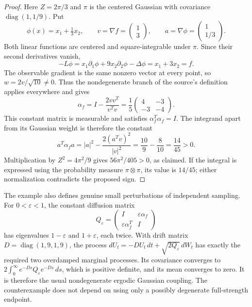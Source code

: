 \documentclass[10pt]{article}
\begin{document}
\begin{proof}
Here \(Z=2\pi/3\) and \(\pi\) is the centered Gaussian with covariance
\(\operatorname{diag}(1,1/9)\). Put
\[
 \phi(x)=x_1+\tfrac13x_2,\qquad
 v=\nabla f=\begin{pmatrix}1\\3\end{pmatrix},\qquad
 a=\nabla\phi=\begin{pmatrix}1\\1/3\end{pmatrix}.
\]
Both linear functions are centered and square-integrable under \(\pi\).
Since their second derivatives vanish,
\[
 -L\phi
 =x_1\partial_1\phi+9x_2\partial_2\phi-\Delta\phi
 =x_1+3x_2=f.
\]
The observable gradient is the same nonzero vector at every point, so
\(w=2v/\sqrt{10}\neq0\). Thus the nondegenerate branch of the source's
definition applies everywhere and gives
\[
 \alpha_f=I-\frac{2vv^T}{v^Tv}
 =\frac15\begin{pmatrix}4&-3\\-3&-4\end{pmatrix}.
\]
This constant matrix is measurable and satisfies \(\alpha_f^T\alpha_f=I\).
The integrand apart from its Gaussian weight is therefore the constant
\[
 a^T\alpha_fa
 =|a|^2-\frac{2(a^Tv)^2}{|v|^2}
 =\frac{10}{9}-\frac{8}{10}
 =\frac{14}{45}>0.
\]
Multiplication by \(Z^2=4\pi^2/9\) gives \(56\pi^2/405>0\), as claimed.
If the integral is expressed using the probability measure
\(\pi\otimes\pi\), its value is \(14/45\); either normalization contradicts
the proposed sign.
\end{proof}

The example also defines genuine small perturbations of independent
sampling. For \(0<\varepsilon<1\), the constant diffusion matrix
\[
 Q_\varepsilon=
 \begin{pmatrix}I&\varepsilon\alpha_f\\
                 \varepsilon\alpha_f^T&I\end{pmatrix}
\]
has eigenvalues \(1-\varepsilon\) and \(1+\varepsilon\), each twice.
With drift matrix
\(D=\operatorname{diag}(1,9,1,9)\), the process
\(dU_t=-DU_t\,dt+\sqrt{2Q_\varepsilon}\,dW_t\)
has exactly the required two overdamped marginal processes.
Its covariance converges to
\(2\int_0^\infty e^{-Ds}Q_\varepsilon e^{-Ds}\,ds\), which is positive
definite, and its mean converges to zero. It is therefore the usual
nondegenerate ergodic Gaussian coupling. The counterexample does not
depend on using only a possibly degenerate full-strength endpoint.
\end{document}
